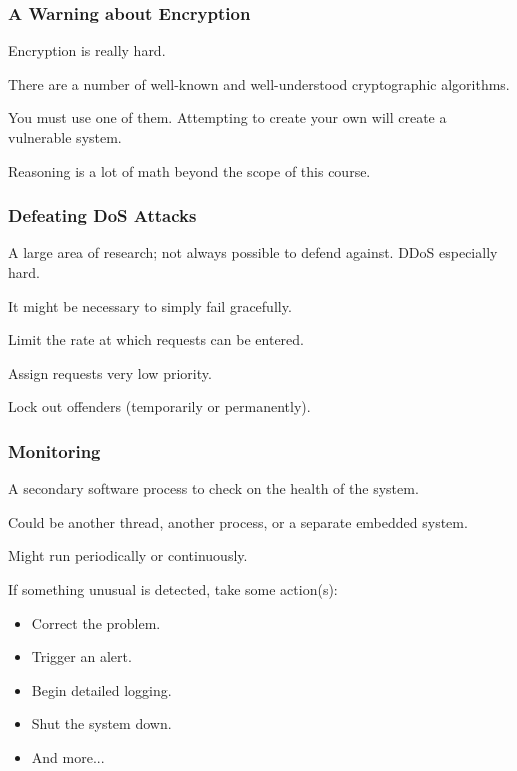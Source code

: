 \begin{frame}
\frametitle{A Warning about Encryption}
\begin{changemargin}{1cm}

Encryption is really hard.

There are a number of well-known and well-understood cryptographic algorithms.

You must use one of them. Attempting to create your own will create a vulnerable system.

Reasoning is a lot of math beyond the scope of this course.

\end{changemargin}
\end{frame}


\begin{frame}
\frametitle{Defeating DoS Attacks}
\begin{changemargin}{1cm}

A large area of research; not always possible to defend against. DDoS especially hard.

It might be necessary to simply fail gracefully.

Limit the rate at which requests can be entered. 

Assign requests very low priority. 

Lock out offenders (temporarily or permanently).
\end{changemargin}
\end{frame}

\begin{frame}
\frametitle{Monitoring}
\begin{changemargin}{1cm}

A secondary software process to check on the health of the system.

Could be another thread, another process, or a separate embedded system.

Might run periodically or continuously.

If something unusual is detected, take some action(s):
\begin{itemize}
	\item Correct the problem.
	\item Trigger an alert.
	\item Begin detailed logging.
	\item Shut the system down.
	\item And more...
\end{itemize}

\end{changemargin}
\end{frame}

